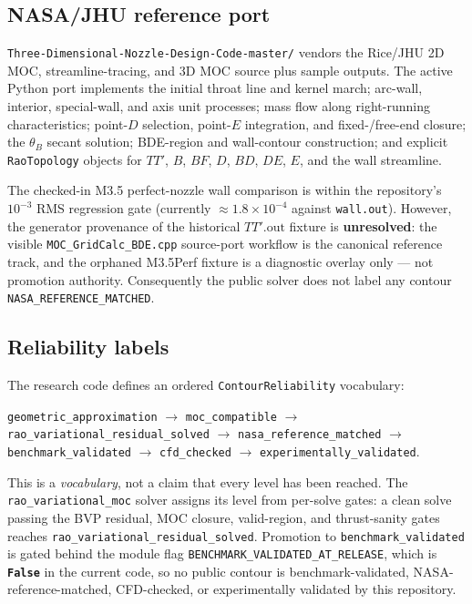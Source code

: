 \documentclass[11pt]{article}
\newcommand{\code}[1]{\texttt{#1}}
\begin{document}
\subsection{NASA/JHU reference port}
\code{Three-Dimensional-Nozzle-Design-Code-master/} vendors the Rice/JHU 2D
MOC, streamline-tracing, and 3D MOC source plus sample outputs. The active
Python port implements the initial throat line and kernel march; arc-wall,
interior, special-wall, and axis unit processes; mass flow along
right-running characteristics; point-$D$ selection, point-$E$ integration,
and fixed-/free-end closure; the $\theta_B$ secant solution; BDE-region and
wall-contour construction; and explicit \code{RaoTopology} objects for $TT'$,
$B$, $BF$, $D$, $BD$, $DE$, $E$, and the wall streamline.

The checked-in M3.5 perfect-nozzle wall comparison is within the repository's
$10^{-3}$ RMS regression gate (currently $\approx 1.8\times10^{-4}$ against
\code{wall.out}). However, the generator provenance of the historical
$TT'.\text{out}$ fixture is \textbf{unresolved}: the visible
\code{MOC\_GridCalc\_BDE.cpp} source-port workflow is the canonical reference
track, and the orphaned M3.5Perf fixture is a diagnostic overlay only --- not
promotion authority. Consequently the public solver does not label any
contour \code{NASA\_REFERENCE\_MATCHED}.

\subsection{Reliability labels}\label{sec:reliability}
The research code defines an ordered \code{ContourReliability} vocabulary:
\begin{center}
\code{geometric\_approximation} $\rightarrow$ \code{moc\_compatible}
$\rightarrow$ \code{rao\_variational\_residual\_solved} $\rightarrow$
\code{nasa\_reference\_matched} $\rightarrow$ \code{benchmark\_validated}
$\rightarrow$ \code{cfd\_checked} $\rightarrow$
\code{experimentally\_validated}.
\end{center}
This is a \emph{vocabulary}, not a claim that every level has been reached.
The \code{rao\_variational\_moc} solver assigns its level from per-solve
gates: a clean solve passing the BVP residual, MOC closure, valid-region, and
thrust-sanity gates reaches \code{rao\_variational\_residual\_solved}.
Promotion to \code{benchmark\_validated} is gated behind the module flag
\code{BENCHMARK\_VALIDATED\_AT\_RELEASE}, which is \textbf{\code{False}} in the
current code, so no public contour is benchmark-validated,
NASA-reference-matched, CFD-checked, or experimentally validated by this
repository.
\end{document}
